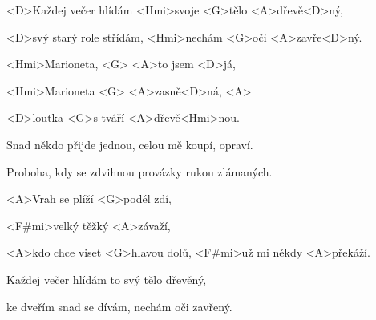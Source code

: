 
\zs
<D>Každej večer hlídám
<Hmi>svoje <G>tělo <A>dřevě<D>ný,

<D>svý starý role střídám,
<Hmi>nechám <G>oči <A>zavře<D>ný.
\ks

\zr
<Hmi>Marioneta, <G> <A>to jsem <D>já,

<Hmi>Marioneta <G> <A>zasně<D>ná, <A> 

<D>loutka <G>s tváří <A>dřevě<Hmi>nou.
\kr


\zs
Snad někdo přijde jednou,
celou mě koupí, opraví.

Proboha, kdy se zdvihnou
provázky rukou zlámaných.
\ks

\zr
\kr

\zs
<A>Vrah se plíží <G>podél zdí,

<F#mi>velký těžký <A>závaží,

<A>kdo chce viset <G>hlavou dolů,
<F#mi>už mi někdy <A>překáží.
\ks

\zs
Každej večer hlídám
to svý tělo dřevěný,

ke dveřím snad se dívám,
nechám oči zavřený.
\ks


\zr \kr
\kp


